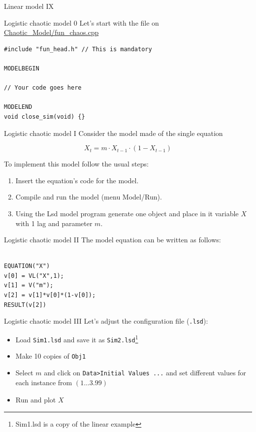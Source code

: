 \documentclass[bigger,aspectratio=169]{beamer}
\begin{document}
\begin{frame}[label={sec:orgfb9b78e}]{Linear model IX}
\begin{center}

\end{center}
\end{frame}
\begin{frame}[label={sec:org7b662c3},fragile]{Logistic chaotic model 0}
 Let's start with the file on \url{Chaotic\_Model/fun\_chaos.cpp}


\begin{verbatim}
#include "fun_head.h" // This is mandatory

MODELBEGIN

// Your code goes here

MODELEND
void close_sim(void) {}
\end{verbatim}
\end{frame}
\begin{frame}[label={sec:org606394b}]{Logistic chaotic model I}
Consider the model made of the single equation

\[X_{t} = m\cdot X_{t-1}\cdot (1 - X_{t-1})\]

To implement this model follow the usual steps:
\begin{enumerate}
\item Insert the equation’s code for the model.
\item Compile and run the model (menu \alert{Model/Run}).
\item Using the Lsd model program generate one object and place in it variable \(X\) with 1 lag and parameter \(m\).
\end{enumerate}
\end{frame}
\begin{frame}[label={sec:org09cb88d},fragile]{Logistic chaotic model II}
 The model equation can be written as follows:


\begin{verbatim}

EQUATION("X")
v[0] = VL("X",1);
v[1] = V("m");
v[2] = v[1]*v[0]*(1-v[0]);
RESULT(v[2])
\end{verbatim}
\end{frame}
\begin{frame}[label={sec:orge915bfe},fragile]{Logistic chaotic model III}
 Let's adjust the configuration file (\texttt{.lsd}):

\begin{itemize}
\item Load \texttt{Sim1.lsd} and save it as \texttt{Sim2.lsd}\footnote{Sim1.lsd is a copy of the linear example}
\item Make \alert{10} copies of \texttt{Obj1}
\item Select \(m\) and click on \texttt{Data>Initial Values ...} and set different values for each instance from \((1 \ldots 3.99)_{}\)
\item Run and plot \(X\)
\end{itemize}
\end{frame}
\end{document}
